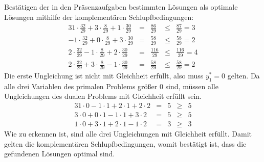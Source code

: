 \documentclass[10pt,a4paper,oneside,ngerman,numbers=noenddot]{scrartcl}
\begin{document}
	\subsection{} %
		Bestätigen der in den Präsenzaufgaben bestimmten Lösungen als optimale Lösungen mithilfe der komplementären Schlupfbedingungen:
		\begin{alignat*}{3}
			1 \cdot \frac{32}{29} + 3 \cdot \frac{8}{29} + 1 \cdot \frac{30}{29} &=& \frac{86}{29} &\leq & \frac{87}{29} = 3 \\
			-1 \cdot \frac{32}{29} + 0 \cdot \frac{8}{29} + 3 \cdot \frac{30}{29} &=& \frac{58}{29} &\leq & \frac{58}{29} = 2 \\
			2 \cdot \frac{32}{29} - 1 \cdot \frac{8}{29} + 2 \cdot \frac{30}{29} &=& \frac{116}{29} &\leq & \frac{116}{29} = 4 \\
			2 \cdot \frac{32}{29} + 3 \cdot \frac{8}{29} - 1 \cdot \frac{30}{29} &=& \frac{58}{29} &\leq & \frac{58}{29} = 2
		\end{alignat*}
		Die erste Ungleichung ist nicht mit Gleichheit erfüllt, also muss $y_{1}^{*} = 0$ gelten. Da alle drei Variablen des primalen Problems größer $0$ sind, müssen alle Ungleichungen des dualen Problems mit Gleichheit erfüllt sein.
		\begin{alignat*}{3}
			1 \cdot 0 - 1 \cdot 1 + 2 \cdot 1 + 2 \cdot 2 &=& 5 &\geq & 5 \\
			3 \cdot 0 + 0 \cdot 1 - 1 \cdot 1 + 3 \cdot 2 &=& 5 &\geq & 5 \\
			1 \cdot 0 + 3 \cdot 1 + 2 \cdot 1 - 1 \cdot 2 &=& 3 &\geq & 3
		\end{alignat*}
		Wie zu erkennen ist, sind alle drei Ungleichungen mit Gleichheit erfüllt. Damit gelten die komplementären Schlupfbedingungen, womit bestätigt ist, dass die gefundenen Lösungen optimal sind.
\end{document}
